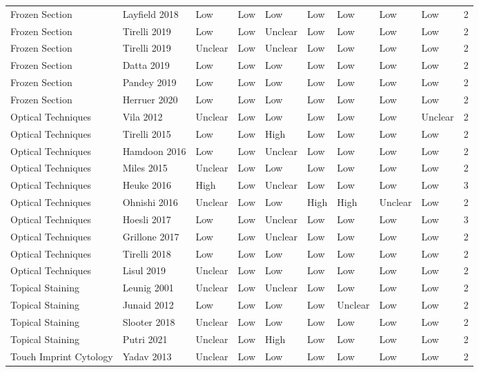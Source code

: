 \begin{table}[ht]
\begin{tabular}{llllllllll}
  Frozen Section & Layfield 2018 & Low & Low & Low & Low & Low & Low & Low & 2 \\ 
  Frozen Section & Tirelli 2019 & Low & Low & Unclear & Low & Low & Low & Low & 2 \\ 
  Frozen Section & Tirelli 2019 & Unclear & Low & Unclear & Low & Low & Low & Low & 2 \\ 
  Frozen Section & Datta 2019 & Low & Low & Low & Low & Low & Low & Low & 2 \\ 
  Frozen Section & Pandey 2019 & Low & Low & Low & Low & Low & Low & Low & 2 \\ 
  Frozen Section & Herruer 2020 & Low & Low & Low & Low & Low & Low & Low & 2 \\ 
  Optical Techniques & Vila 2012 & Unclear & Low & Low & Low & Low & Low & Unclear & 2 \\ 
  Optical Techniques & Tirelli 2015 & Low & Low & High & Low & Low & Low & Low & 2 \\ 
  Optical Techniques & Hamdoon 2016 & Low & Low & Unclear & Low & Low & Low & Low & 2 \\ 
  Optical Techniques & Miles 2015 & Unclear & Low & Low & Low & Low & Low & Low & 2 \\ 
  Optical Techniques & Heuke 2016 & High & Low & Unclear & Low & Low & Low & Low & 3 \\ 
  Optical Techniques & Ohnishi 2016 & Unclear & Low & Low & High & High & Unclear & Low & 2 \\ 
  Optical Techniques & Hoesli 2017 & Low & Low & Unclear & Low & Low & Low & Low & 3 \\ 
  Optical Techniques & Grillone 2017 & Low & Low & Unclear & Low & Low & Low & Low & 2 \\ 
  Optical Techniques & Tirelli 2018 & Low & Low & Low & Low & Low & Low & Low & 2 \\ 
  Optical Techniques & Lisul 2019 & Unclear & Low & Low & Low & Low & Low & Low & 2 \\ 
  Topical Staining & Leunig 2001 & Unclear & Low & Unclear & Low & Low & Low & Low & 2 \\ 
  Topical Staining & Junaid 2012 & Low & Low & Low & Low & Unclear & Low & Low & 2 \\ 
  Topical Staining & Slooter 2018 & Unclear & Low & Low & Low & Low & Low & Low & 2 \\ 
  Topical Staining & Putri 2021 & Unclear & Low & High & Low & Low & Low & Low & 2 \\ 
  Touch Imprint Cytology & Yadav 2013 & Unclear & Low & Low & Low & Low & Low & Low & 2 \\ 

\end{tabular}
\end{table}

